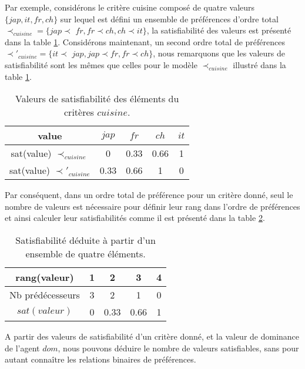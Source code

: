 			Par exemple, considérons le critère cuisine composé de quatre valeurs $\{jap,it,fr,ch\}$ sur lequel est défini un ensemble de préférences d'ordre total $\prec_{cuisine} = \{jap$$\prec$ $fr, fr$$\prec$$ ch, ch$$\prec$$it\}$, la satisfiabilité des valeurs est présenté dans la table \ref{tab:ex2_sat}. Considérons maintenant, un second ordre total de préférences $\prec'_{cuisine} = \{it$$\prec$ $jap, jap$$\prec$$ fr, fr$$\prec$$ch\}$, nous remarquons que les valeurs de satisfiabilité sont les mêmes que celles pour le modèle $\prec_{cuisine}$ illustré dans la table \ref{tab:ex2_sat}. 
			
			
				 	\begin{table} [h]
				 		\centering
				 		\caption{Valeurs de satisfiabilité des éléments du critères $cuisine$.}
				 		\begin{tabular}{ |c|c|c|c|c| }
				 			\hline
				 			value & $jap$ & $fr$ & $ch$ & $it$ \\	
				 			\hline
				 			sat(value) $\prec_{cuisine}$ & 0 & 0.33 & 0.66 & 1 \\
				 			\hline
				 			sat(value) $\prec'_{cuisine}$ & 0.33 & 0.66 & 1 & 0 \\
				 			\hline
				 		\end{tabular}
				 		
				 		\label{tab:ex2_sat}
				 		
				 	\end{table}
				 	
			Par conséquent, dans un ordre total de préférence pour un critère donné, seul le nombre de valeurs est nécessaire pour définir leur rang dans l'ordre de préférences et ainsi calculer leur satisfiabilités comme il est présenté dans la table \ref{tab:poss}. 
			
			
			\begin{table}[h]
				\caption{Satisfiabilité déduite à partir d'un ensemble de quatre éléments.}
				\label{tab:poss}
				\centering

				\begin{tabular}{ |c|c|c|c|c| }
					\hline				
					rang(valeur) & 1 & 2 & 3 & 4 \\
					\hline
					Nb prédécesseurs & 3 & 2 & 1& 0 \\
					\hline
					$sat(valeur)$ & 0 & 0.33 & 0.66 &1 \\
					\hline
				\end{tabular}
			\end{table}
		
		A partir  des valeurs de satisfiabilité d'un critère donné, et la valeur de dominance de l'agent $dom$, nous pouvons déduire le nombre de valeurs satisfiables, sans pour autant connaître les relations binaires de préférences. 
		
